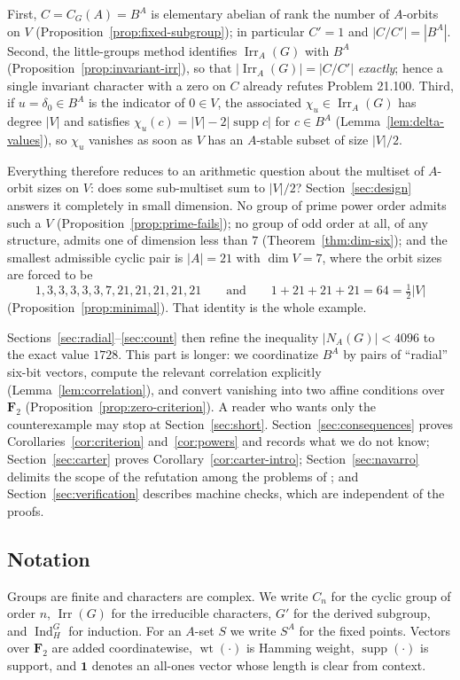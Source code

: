 \documentclass[11pt]{article}
\theoremstyle{definition}
\theoremstyle{remark}
\newcommand{\F}{\mathbf F}
\newcommand{\Irr}{\operatorname{Irr}}
\newcommand{\Ind}{\operatorname{Ind}}
\newcommand{\supp}{\operatorname{supp}}
\newcommand{\wt}{\operatorname{wt}}
\newcommand{\one}{\mathbf 1}
\begin{document}
First, $C=C_G(A)=B^A$ is elementary abelian of rank the number of
$A$-orbits on $V$ (Proposition~\ref{prop:fixed-subgroup}); in particular
$C'=1$ and $|C/C'|=|B^A|$.  Second, the little-groups method identifies
$\Irr_A(G)$ with $B^A$ (Proposition~\ref{prop:invariant-irr}), so that
$|\Irr_A(G)|=|C/C'|$ \emph{exactly}; hence a single invariant character
with a zero on $C$ already refutes Problem 21.100.  Third, if
$u=\delta_0\in B^A$ is the indicator of $0\in V$, the associated
$\chi_u\in\Irr_A(G)$ has degree $|V|$ and satisfies
$\chi_u(c)=|V|-2|\supp c|$ for $c\in B^A$
(Lemma~\ref{lem:delta-values}), so $\chi_u$ vanishes as soon as $V$ has
an $A$-stable subset of size $|V|/2$.

Everything therefore reduces to an arithmetic question about the
multiset of $A$-orbit sizes on $V$: does some sub-multiset sum to
$|V|/2$?  Section~\ref{sec:design} answers it completely in small
dimension.  No group of prime power order admits such a $V$
(Proposition~\ref{prop:prime-fails}); no group of odd order at all,
of any structure, admits one of dimension less than $7$
(Theorem~\ref{thm:dim-six}); and the smallest admissible cyclic pair is
$|A|=21$ with $\dim V=7$, where the orbit sizes are forced to be
\[
 1,3,3,3,3,3,7,21,21,21,21,21
 \qquad\text{and}\qquad
 1+21+21+21=64=\tfrac12|V|
\]
(Proposition~\ref{prop:minimal}).  That identity is the whole example.

Sections~\ref{sec:radial}--\ref{sec:count} then refine the inequality
$|N_A(G)|<4096$ to the exact value $1728$.  This part is longer: we
coordinatize $B^A$ by pairs of ``radial'' six-bit vectors, compute the
relevant correlation explicitly (Lemma~\ref{lem:correlation}), and
convert vanishing into two affine conditions over $\F_2$
(Proposition~\ref{prop:zero-criterion}).  A reader who wants only the
counterexample may stop at Section~\ref{sec:short}.
Section~\ref{sec:consequences} proves
Corollaries~\ref{cor:criterion} and~\ref{cor:powers} and records what
we do not know; Section~\ref{sec:carter} proves
Corollary~\ref{cor:carter-intro}; Section~\ref{sec:navarro} delimits
the scope of the refutation among the problems of
\cite{navarro-problems}; and Section~\ref{sec:verification} describes
machine checks, which are independent of the proofs.

\subsection*{Notation}

Groups are finite and characters are complex.  We write $C_n$ for the
cyclic group of order $n$, $\Irr(G)$ for the irreducible characters,
$G'$ for the derived subgroup, and $\Ind_H^G$ for induction.  For an
$A$-set $S$ we write $S^A$ for the fixed points.  Vectors over $\F_2$
are added coordinatewise, $\wt(\cdot)$ is Hamming weight, $\supp(\cdot)$
is support, and $\one$ denotes an all-ones vector whose length is clear
from context.
\end{document}
